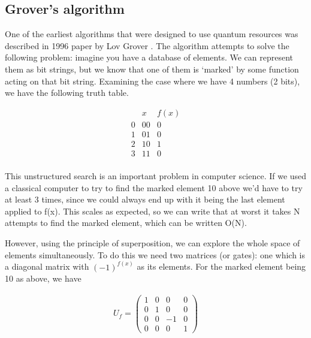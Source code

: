 \subsection{Grover's algorithm}

One of the earliest algorithms that were designed to use quantum resources was described in 1996 paper by Lov Grover \cite{grover1996}. The algorithm attempts to solve the following problem: imagine you have a database of elements. We can represent them as bit strings, but we know that one of them is `marked' by some function acting on that bit string. Examining the case where we have 4 numbers (2 bits), we have the following truth table. 

\begin{equation}
\begin{array}{c|c|c}
    & x & f(x) \\
    \hline
    0 & 00 & 0 \\
    1 & 01 & 0 \\
    2 & 10 & 1 \\
    3 & 11 & 0 \\
\end{array}
\end{equation}

This unstructured search is an important problem in computer science. If we used a classical computer to try to find the marked element 10 above we'd have to try at least 3 times, since we could always end up with it being the last element applied to f(x). This scales as expected, so we can write that at worst it takes N attempts to find the marked element, which can be written O(N).

However, using the principle of superposition, we can explore the whole space of elements simultaneously. To do this we need two matrices (or gates): one which is a diagonal matrix with $(-1)^{f(x)}$ as its elements. For the marked element being 10 as above, we have

\begin{align}
        U_f = \begin{pmatrix}
        1 & 0 & 0 & 0 \\
                 0 & 1 & 0 & 0\\
                 0  & 0 & -1 & 0 \\
                 0 & 0 & 0 & 1
        \end{pmatrix}
\end{align}

